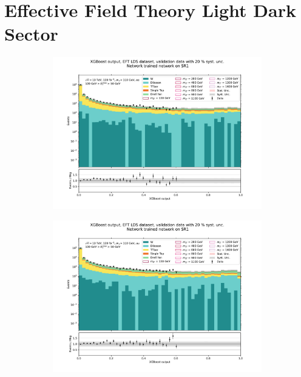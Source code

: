 \documentclass[12pt, a4paper]{book}
\begin{document}
\section{Effective Field Theory Light Dark Sector}
\begin{figure}[!ht]
	\centering
	\begin{subfigure}[b]{0.49\textwidth}
      \centering
      \includegraphics[width=1\textwidth]{XGBoost/Model_independent/50-100/EFT_LDS/VAL_ee.pdf}
   \end{subfigure}
   \hfill
   \begin{subfigure}[b]{0.49\textwidth}
      \centering
      \includegraphics[width=1\textwidth]{XGBoost/Model_independent/50-100/EFT_LDS/VAL_uu.pdf}
   \end{subfigure}

\end{figure}
\end{document}
